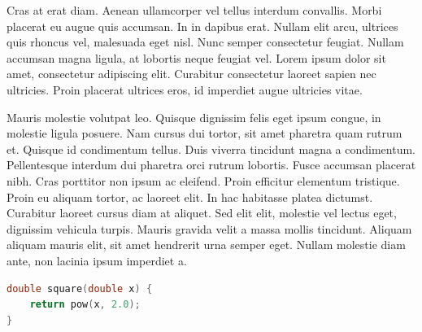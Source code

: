 Cras at erat diam. Aenean ullamcorper vel tellus interdum convallis. Morbi
placerat eu augue quis accumsan. In in dapibus erat. Nullam elit arcu,
ultrices quis rhoncus vel, malesuada eget nisl. Nunc semper consectetur
feugiat. Nullam accumsan magna ligula, at lobortis neque feugiat vel. Lorem
ipsum dolor sit amet, consectetur adipiscing elit. Curabitur consectetur
laoreet sapien nec ultricies. Proin placerat ultrices eros, id imperdiet
augue ultricies vitae. \cite{texbook}

\begin{minipage}{\linewidth}

\end{minipage}

Mauris molestie volutpat leo. Quisque dignissim felis eget ipsum congue, in
molestie ligula posuere. Nam cursus dui tortor, sit amet pharetra quam
rutrum et. Quisque id condimentum tellus. Duis viverra tincidunt magna a
condimentum. Pellentesque interdum dui pharetra orci rutrum lobortis. Fusce
accumsan placerat nibh. Cras porttitor non ipsum ac eleifend. Proin
efficitur elementum tristique. Proin eu aliquam tortor, ac laoreet elit. In
hac habitasse platea dictumst. Curabitur laoreet cursus diam at aliquet.
Sed elit elit, molestie vel lectus eget, dignissim vehicula turpis. Mauris
gravida velit a massa mollis tincidunt. Aliquam aliquam mauris elit, sit
amet hendrerit urna semper eget. Nullam molestie diam ante, non lacinia
ipsum imperdiet a.\cite{latex:companion}

\begin{minipage}{\linewidth}
\begin{lstlisting}[language=C,caption={Sed fermentum vel eros ut malesuada. 
   Aenean at venenatis neque. Aliquam eu magna nec elit pellentesque laoreet 
   sed vitae eros. Proin ac blandit felis. Integer molestie dolor eget metus 
   laoreet, sed euismod est consequat. Morbi vel lacus gravida justo vulputate 
   euismod. Nam vulputate mauris non odio consectetur, vitae cursus 
   massa faucibus.}]
double square(double x) {
    return pow(x, 2.0);
}
\end{lstlisting}
\end{minipage}


